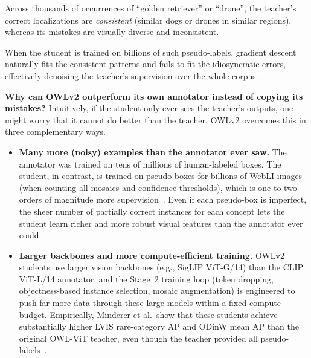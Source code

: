 \begin{enrichment}
\begin{enrichment}
\begin{enumerate}
\begin{itemize}
				\newpage
				
				Across thousands of occurrences of ``golden retriever'' or ``drone'', the teacher’s correct localizations are \emph{consistent} (similar dogs or drones in similar regions), whereas its mistakes are visually diverse and inconsistent.
				
				When the student is trained on billions of such pseudo-labels, gradient descent naturally fits the consistent patterns and fails to fit the idiosyncratic errors, effectively denoising the teacher’s supervision over the whole corpus~\cite{minderer2024_owlvitv2}.
			\end{itemize}
			
			\medskip
			\noindent
			\textbf{Why can OWLv2 outperform its own annotator instead of copying its mistakes?}
			Intuitively, if the student only ever sees the teacher’s outputs, one might worry that it cannot do better than the teacher.
			OWLv2 overcomes this in three complementary ways.
			
			\begin{itemize}
				\item \textbf{Many more (noisy) examples than the annotator ever saw.}
				The annotator was trained on tens of millions of human-labeled boxes.
				The student, in contrast, is trained on pseudo-boxes for billions of WebLI images (when counting all mosaics and confidence thresholds), which is one to two orders of magnitude more supervision~\cite{minderer2024_owlvitv2}.
				Even if each pseudo-box is imperfect, the sheer number of partially correct instances for each concept lets the student learn richer and more robust visual features than the annotator ever could.
				
				\item \textbf{Larger backbones and more compute-efficient training.}
				OWLv2 students use larger vision backbones (e.g., SigLIP ViT-G/14) than the CLIP ViT-L/14 annotator, and the Stage~2 training loop (token dropping, objectness-based instance selection, mosaic augmentation) is engineered to push far more data through these large models within a fixed compute budget.
				Empirically, Minderer et al.\ show that these students achieve substantially higher LVIS rare-category AP and ODinW mean AP than the original OWL-ViT teacher, even though the teacher provided all pseudo-labels~\cite{minderer2024_owlvitv2}.
				

\end{itemize}
\end{enumerate}
\end{enrichment}
\end{enrichment}
